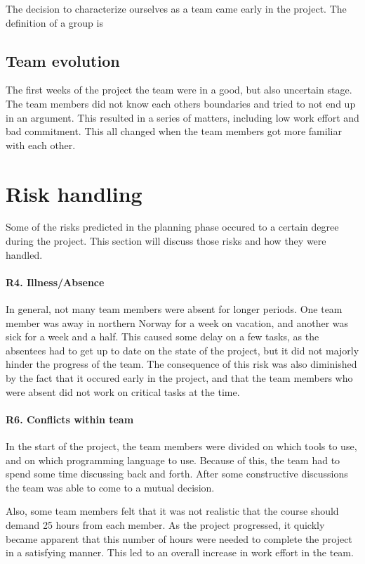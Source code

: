 The decision to characterize ourselves as a team came early in the project. The definition of a group is 


\subsection{Team evolution}
The first weeks of the project the team were in a good, but also uncertain stage. The team members did not know each others boundaries and tried to not end up in an argument. This resulted in a series of matters, including low work effort and bad commitment. This all changed when the team members got more familiar with each other.   

\section{Risk handling}
Some of the risks predicted in the planning phase occured to a certain degree during the project.
This section will discuss those risks and how they were handled.

\paragraph{R4. Illness/Absence}
In general, not many team members were absent for longer periods.
One team member was away in northern Norway for a week on vacation, and another was sick for a week and a half. This caused some delay on a few tasks, as the absentees had to get up to date on the state of the project, but it did not majorly hinder the progress of the team. The consequence of this risk was also diminished by the fact that it occured early in the project, and that the team members who were absent did not work on critical tasks at the time.

\paragraph{R6. Conflicts within team}
In the start of the project, the team members were divided on which tools to use, and on which programming language to use. Because of this, the team had to spend some time discussing back and forth. After some constructive discussions the team was able to come to a mutual decision.

Also, some team members felt that it was not realistic that the course should demand 25 hours from each member. As the project progressed, it quickly became apparent that this number of hours were needed to complete the project in a satisfying manner. This led to an overall increase in work effort in the team.

